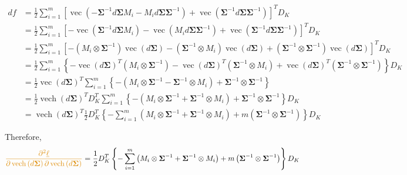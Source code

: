 \documentclass[11pt]{article}
\newcommand{\bs}{\boldsymbol}
\newcommand{\opn}{\operatorname}
\begin{document}
\begin{align*}
  df &= \frac{1}{2}\sum_{i=1}^{m} \left[\opn{vec}\left(-\bs{\Sigma}^{-1}d\bs{\Sigma}M_{i} - M_{i}d\bs{\Sigma}\bs{\Sigma}^{-1} \right) + \opn{vec}\left(\bs{\Sigma}^{-1}d\bs{\Sigma}\bs{\Sigma}^{-1} \right)\right]^{T}D_{K}\\
  &= \frac{1}{2}\sum_{i=1}^{m} \left[-\opn{vec}\left(\bs{\Sigma}^{-1}d\bs{\Sigma}M_{i} \right) - \opn{vec}\left(M_{i}d\bs{\Sigma}\bs{\Sigma}^{-1} \right) + \opn{vec}\left(\bs{\Sigma}^{-1}d\bs{\Sigma}\bs{\Sigma}^{-1} \right) \right]^{T}D_{K}\\
  &= \frac{1}{2}\sum_{i=1}^{m} \left[- \left(M_{i} \otimes \bs{\Sigma}^{-1} \right) \opn{vec}\left(d\bs{\Sigma} \right) - \left(\bs{\Sigma}^{-1}\otimes M_{i} \right) \opn{vec}\left(d\bs{\Sigma} \right) + \left(\bs{\Sigma}^{-1} \otimes \bs{\Sigma}^{-1} \right)\opn{vec}\left(d\bs{\Sigma} \right) \right]^{T}D_{K}\\
  &= \frac{1}{2}\sum_{i=1}^{m} \left\{-\opn{vec}\left(d\bs{\Sigma} \right)^{T}\left(M_{i}\otimes \bs{\Sigma}^{-1} \right)- \opn{vec}\left(d\bs{\Sigma} \right)^{T}\left(\bs{\Sigma}^{-1}\otimes M_{i} \right) + \opn{vec}\left(d\bs{\Sigma} \right)^{T} \left(\bs{\Sigma}^{-1} \otimes \bs{\Sigma}^{-1} \right) \right\}D_{K}\\
  &= \frac{1}{2}\opn{vec}\left(d\bs{\Sigma} \right)^{T} \sum_{i=1}^{m} \left\{-\left(M_{i}\otimes \bs{\Sigma}^{-1}- \bs{\Sigma}^{-1}\otimes M_{i} \right) + \bs{\Sigma}^{-1}\otimes \bs{\Sigma}^{-1} \right\}\\
  &= \frac{1}{2}\opn{vech}\left(d\bs{\Sigma} \right)^{T}D_{K}^{T} \sum_{i=1}^{m} \left\{-\left(M_{i}\otimes \bs{\Sigma}^{-1}+\bs{\Sigma}^{-1}\otimes M_{i} \right) + \bs{\Sigma}^{-1}\otimes \bs{\Sigma}^{-1} \right\}D_{K}\\
  &= \opn{vech}\left(d\bs{\Sigma} \right)^{T} \frac{1}{2}D_{K}^{T}\left\{-\sum_{i=1}^{m}\left(M_{i} \otimes \bs{\Sigma}^{-1} + \bs{\Sigma}^{-1}\otimes M_{i} \right) + m\left(\bs{\Sigma}^{-1}\otimes \bs{\Sigma}^{-1} \right) \right\}D_{K}
\end{align*}

Therefore,
$$
  \textcolor{myorange}{\frac{\partial^{2} \underline{\ell}}{\partial \opn{vech}\left(d\bs{\Sigma} \right)\partial \opn{vech}\left( d\bs{\Sigma}\right)}} = \frac{1}{2}D_{K}^{T}\left\{-\sum_{i=1}^{m}\left(M_{i} \otimes \bs{\Sigma}^{-1} + \bs{\Sigma}^{-1}\otimes M_{i} \right) + m\left(\bs{\Sigma}^{-1}\otimes \bs{\Sigma}^{-1} \right) \right\}D_{K}
$$
\end{document}
